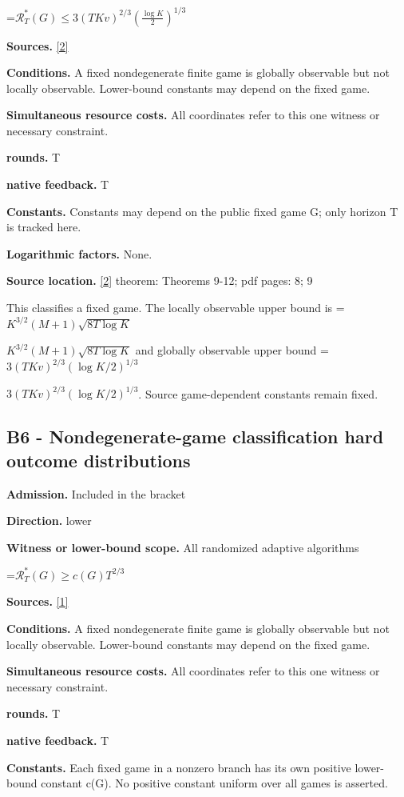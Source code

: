 \documentclass[10pt,a4paper]{article}
\newcommand{\AtlasMath}[1]{\par\begingroup\centering\setbox0=\hbox{$\displaystyle #1$}\ifdim\wd0>1.4\linewidth\typeout{ATLAS WIDE FORMULA: \the\wd0}\fi\ifdim\wd0>\linewidth\resizebox{\linewidth}{!}{\box0}\else\box0\fi\par\endgroup}
\newcommand{\AtlasInlineMath}[1]{\begingroup\setbox0=\hbox{$#1$}\ifdim\wd0>.4\linewidth\endgroup\AtlasMath{#1}\else\endgroup$#1$\fi}
\begin{document}
\AtlasMath{\mathcal{R}_T^*(G)\le3(TKv)^{2/3}\left(\frac{\log K}{2}\right)^{1/3}}
\textbf{Sources.} \href{https://proceedings.mlr.press/v99/lattimore19a/lattimore19a.pdf}{[2]}

\textbf{Conditions.} A fixed nondegenerate finite game is globally observable but not locally observable. Lower-bound constants may depend on the fixed game.

\textbf{Simultaneous resource costs.} All coordinates refer to this one witness or necessary constraint.

\textbf{rounds.} T

\textbf{native feedback.} T

\textbf{Constants.} Constants may depend on the public fixed game G; only horizon T is tracked here.

\textbf{Logarithmic factors.} None.

\textbf{Source location.} \href{https://proceedings.mlr.press/v99/lattimore19a/lattimore19a.pdf}{[2]} theorem: Theorems 9-12; pdf pages: 8; 9

This classifies a fixed game. The locally observable upper bound is \AtlasInlineMath{K^{3/2}(M+1)\sqrt{8T\log K}} and globally observable upper bound \AtlasInlineMath{3(TKv)^{2/3}(\log K/2)^{1/3}}. Source game-dependent constants remain fixed.

\subsection{B6 - Nondegenerate-game classification hard outcome distributions}
\textbf{Admission.} Included in the bracket

\textbf{Direction.} lower

\textbf{Witness or lower-bound scope.} All randomized adaptive algorithms

\AtlasMath{\mathcal{R}_T^*(G)\ge c(G)T^{2/3}}
\textbf{Sources.} \href{https://sites.ualberta.ca/~szepesva/papers/partial_monitoring-mor.pdf}{[1]}

\textbf{Conditions.} A fixed nondegenerate finite game is globally observable but not locally observable. Lower-bound constants may depend on the fixed game.

\textbf{Simultaneous resource costs.} All coordinates refer to this one witness or necessary constraint.

\textbf{rounds.} T

\textbf{native feedback.} T

\textbf{Constants.} Each fixed game in a nonzero branch has its own positive lower-bound constant c(G). No positive constant uniform over all games is asserted.
\end{document}
